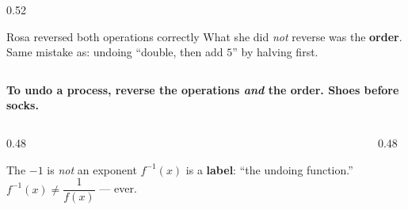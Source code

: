 \documentclass[aspectratio=169, 11pt]{beamer}
\begin{document}
\begin{frame}[t, plain]
\begin{columns}[T]
\begin{column}{0.52\textwidth}
      \begin{block}{Rosa reversed both operations correctly}
        What she did \emph{not} reverse was the \textbf{order}. \\[3pt]
        Same mistake as: undoing ``double, then add $5$'' by halving first.
      \end{block}
    \end{column}
  \end{columns}
  \vspace{3pt}
  \begin{center}
    \textbf{To undo a process, reverse the operations \emph{and} the order. Shoes before socks.}
  \end{center}
\end{frame}

\begin{frame}[t, plain]
  \begin{center}
  \end{center}
  \vspace{4pt}
  \begin{columns}[T]
    \begin{column}{0.48\textwidth}
      \footnotesize
      \begin{block}{The $-1$ is \emph{not} an exponent}
        $f^{-1}(x)$ is a \textbf{label}: ``the undoing function.'' \\[4pt]
        $f^{-1}(x) \ne \dfrac{1}{f(x)}$ \quad --- ever.
      \end{block}
    \end{column}
    \begin{column}{0.48\textwidth}
      \footnotesize
      \begin{center}
      \renewcommand{\arraystretch}{1.5}
      \begin{tabular}{|l|c|c|}

\end{tabular}
\end{center}
\end{column}
\end{columns}
\end{frame}
\end{document}
